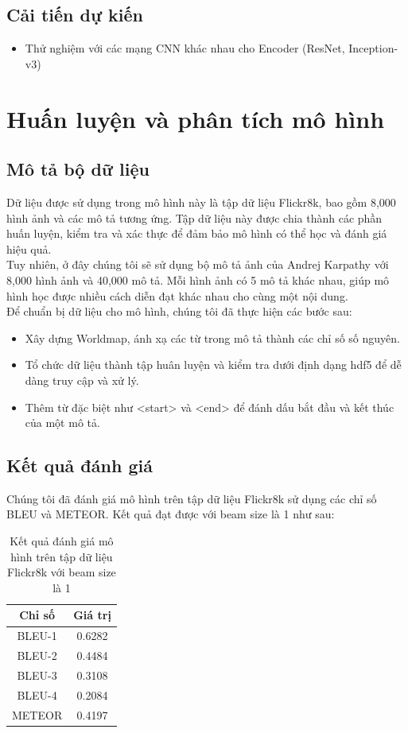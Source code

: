 \documentclass[conference]{IEEEtran}
\begin{document}
\subsection{Cải tiến dự kiến}
\begin{itemize}
    \item Thử nghiệm với các mạng CNN khác nhau cho Encoder (ResNet, Inception-v3)
\end{itemize}

\section{Huấn luyện và phân tích mô hình}
\subsection{Mô tả bộ dữ liệu}

Dữ liệu được sử dụng trong mô hình này là tập dữ liệu Flickr8k, bao gồm 8,000 hình ảnh và các mô tả tương ứng. Tập dữ liệu này được chia thành các phần huấn luyện, kiểm tra và xác thực để đảm bảo mô hình có thể học và đánh giá hiệu quả.\\
Tuy nhiên, ở đây chúng tôi sẽ sử dụng bộ mô tả ảnh của Andrej Karpathy \cite{pytorch_tutorial} với 8,000 hình ảnh và 40,000 mô tả. Mỗi hình ảnh có 5 mô tả khác nhau, giúp mô hình học được nhiều cách diễn đạt khác nhau cho cùng một nội dung.\\
Để chuẩn bị dữ liệu cho mô hình, chúng tôi đã thực hiện các bước sau:
\begin{itemize}
    \item Xây dựng Worldmap, ánh xạ các từ trong mô tả thành các chỉ số số nguyên.
    \item Tổ chức dữ liệu thành tập huân luyện và kiểm tra dưới định dạng hdf5 để dễ dàng truy cập và xử lý.
    \item Thêm từ đặc biệt như <start> và <end> để đánh dấu bắt đầu và kết thúc của một mô tả.
\end{itemize}

\subsection{Kết quả đánh giá}

Chúng tôi đã đánh giá mô hình trên tập dữ liệu Flickr8k sử dụng các chỉ số BLEU và METEOR. Kết quả đạt được với beam size là 1 như sau:

\begin{table}[h]
\centering
\begin{tabular}{|c|c|}
\hline
\textbf{Chỉ số} & \textbf{Giá trị} \\
\hline
BLEU-1 & 0.6282 \\
\hline
BLEU-2 & 0.4484 \\
\hline
BLEU-3 & 0.3108 \\
\hline
BLEU-4 & 0.2084 \\
\hline
METEOR & 0.4197 \\
\hline
\end{tabular}
\caption{Kết quả đánh giá mô hình trên tập dữ liệu Flickr8k với beam size là 1}
\label{tab:evaluation}
\end{table}
\end{document}
